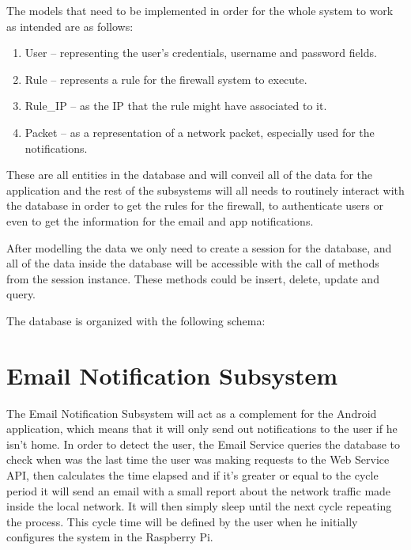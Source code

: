 \begin{enumerate}
The models that need to be implemented in order for the whole system to work as
intended are as follows:
\begin{enumerate}
	\item User -- representing the user's credentials, username and password
		fields.
	\item Rule -- represents a rule for the firewall system to execute.
	\item Rule\_IP -- as the IP that the rule might have associated to it.
	\item Packet -- as a representation of a network packet, especially used for
		the notifications.
\end{enumerate}

These are all entities in the database and will conveil all of the data for the
application and the rest of the subsystems will all needs to routinely interact
with the database in order to get the rules for the firewall, to authenticate
users or even to get the information for the email and app notifications.


After modelling the data we only need to create a session for the database, and
all of the data inside the database will be accessible with the call of methods
from the session instance. These methods could be insert, delete, update and
query.



The database is organized with the following schema:



\section{Email Notification Subsystem}
\label{chap4:sec:email-sys}
The Email Notification Subsystem will act as a complement for the Android
application, which means that it will only send out notifications to the user if
he isn't home. In order to detect the user, the Email Service queries the
database to check when was the last time the user was making requests to the Web
Service API, then calculates the time elapsed and if it's greater or equal to
the cycle period it will send an email with a small report about the network
traffic made inside the local network. It will then simply sleep until the next
cycle repeating the process. This cycle time will be defined by the user when he
initially configures the system in the Raspberry Pi.


\end{enumerate}
